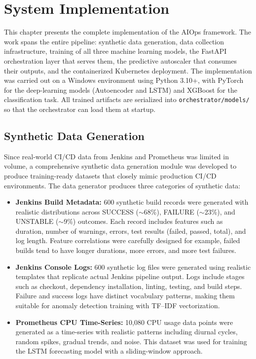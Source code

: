 \documentclass[12pt]{report}
\begin{document}
\clearpage
\chapter{System Implementation}

This chapter presents the complete implementation of the AIOps framework. The work spans the entire pipeline: synthetic data generation, data collection infrastructure, training of all three machine learning models, the FastAPI orchestration layer that serves them, the predictive autoscaler that consumes their outputs, and the containerized Kubernetes deployment. The implementation was carried out on a Windows environment using Python 3.10+, with PyTorch for the deep-learning models (Autoencoder and LSTM) and XGBoost for the classification task. All trained artifacts are serialized into \texttt{orchestrator/models/} so that the orchestrator can load them at startup.

\section{Synthetic Data Generation}

Since real-world CI/CD data from Jenkins and Prometheus was limited in volume, a comprehensive synthetic data generation module was developed to produce training-ready datasets that closely mimic production CI/CD environments. The data generator produces three categories of synthetic data:

\begin{itemize}
    \item \textbf{Jenkins Build Metadata:} 600 synthetic build records were generated with realistic distributions across SUCCESS ($\sim$68\%), FAILURE ($\sim$23\%), and UNSTABLE ($\sim$9\%) outcomes. Each record includes features such as duration, number of warnings, errors, test results (failed, passed, total), and log length. Feature correlations were carefully designed for example, failed builds tend to have longer durations, more errors, and more test failures.

    \item \textbf{Jenkins Console Logs:} 600 synthetic log files were generated using realistic templates that replicate actual Jenkins pipeline output. Logs include stages such as checkout, dependency installation, linting, testing, and build steps. Failure and success logs have distinct vocabulary patterns, making them suitable for anomaly detection training with TF--IDF vectorization.

    \item \textbf{Prometheus CPU Time-Series:} 10,080 CPU usage data points were generated as a time-series with realistic patterns including diurnal cycles, random spikes, gradual trends, and noise. This dataset was used for training the LSTM forecasting model with a sliding-window approach.
\end{itemize}
\end{document}
